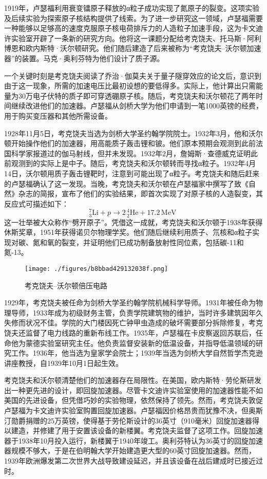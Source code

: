 1919年，卢瑟福利用衰变镭原子释放的α粒子成功实现了氮原子的裂变。这项实验及后续实验为探索原子核结构提供了线索。为了进一步研究这一领域，卢瑟福需要一种能够以足够高的速度克服原子核电荷排斥力的人造粒子加速手段，这为卡文迪许实验室开辟了一条新的研究方向。他将这一课题分配给考克饶夫、托马斯·阿利博恩和欧内斯特·沃尔顿研究。他们随后建造了后来被称为“考克饶夫–沃尔顿加速器”的装置。马克·奥利芬特为他们设计了质子源。

一个关键时刻是考克饶夫阅读了乔治·伽莫夫关于量子隧穿效应的论文后，意识到由于这一现象，所需的加速电压比最初设想的要低得多。实际上，他计算出只需能量为30万电子伏特的质子即可穿透硼原子核。随后，考克饶夫和沃尔顿花了两年时间继续改进他们的加速器。卢瑟福从剑桥大学为他们申请到一笔1000英镑的经费，用于购买变压器和其他所需设备。

1928年11月5日，考克饶夫当选为剑桥大学圣约翰学院院士。1932年3月，他和沃尔顿开始操作他们的加速器，用高能质子轰击锂和铍。他们原本预期会观测到此前法国科学家报道过的伽马射线，但并未发现。1932年2月，詹姆斯·查德威克证明此前观测到的实际上是中子。随后，考克饶夫和沃尔顿转而寻找α粒子。1932年4月14日，沃尔顿用质子轰击锂靶时，注意到可能出现了α粒子。考克饶夫和随后赶来的卢瑟福确认了这一发现。当晚，考克饶夫和沃尔顿在卢瑟福家中撰写了致《自然》杂志的简报，宣布了他们的实验结果，即首次实现了对原子核的人造裂变，其反应式可描述如下：
$$
_3^7\text{Li} + p \rightarrow 2\,_2^4\text{He} + 17.2\,\text{MeV}~
$$
这一壮举被大众称作“劈开原子”。凭借这一成就，考克饶夫和沃尔顿于1938年获得休斯奖章，1951年获得诺贝尔物理学奖。他们随后继续利用质子、氘核和α粒子实现对碳、氮和氧的裂变，并证明他们已成功制备放射性同位素，包括碳-11和氮-13。
\begin{figure}[ht]
\centering
\texttt{[image: ./figures/b8bbad429132038f.png]}
\caption{考克饶夫–沃尔顿倍压电路} \label{fig_YHkrf_3}
\end{figure}
1929年，考克饶夫被任命为剑桥大学圣约翰学院机械科学导师。1931年被任命为物理导师，1933年成为初级财务主管，负责学院建筑物的维护，当时许多建筑因年久失修而状况不佳。学院的大门楼因死亡钟甲虫造成的破坏需要部分拆除修复，考克饶夫还监督了电力线路的重新布线工作。1935年，卢瑟福在卡皮察返回苏联后，任命他为蒙德实验室研究主任。他负责监督安装新的低温设备，并指导低温领域的研究工作。1936年，他当选为皇家学会院士；1939年当选为剑桥大学自然哲学杰克逊讲座教授，自1939年10月1日起生效。

考克饶夫和沃尔顿清楚他们的加速器存在局限性。在美国，欧内斯特·劳伦斯研发出一种更先进的设计，即回旋加速器。尽管卡文迪许实验室使用的加速器性能不如美国的先进设备，但凭借巧妙的实验物理，依然保持了领先。然而，考克饶夫敦促卢瑟福为卡文迪许实验室购置回旋加速器。卢瑟福因价格昂贵而犹豫不决，但奥斯汀勋爵捐赠的25万英镑，使得基于劳伦斯设计的36英寸（910毫米）回旋加速器得以建造，并修建了用于安置该设备的新楼翼。考克饶夫监督了这项工作。回旋加速器于1938年10月投入运行，新楼翼于1940年竣工。奥利芬特认为36英寸的回旋加速器规模不够大，于是在伯明翰大学开始建造更大型的60英寸回旋加速器。然而，1939年欧洲爆发第二次世界大战导致建设延迟，并且该设备在战后建成时已接近过时。
